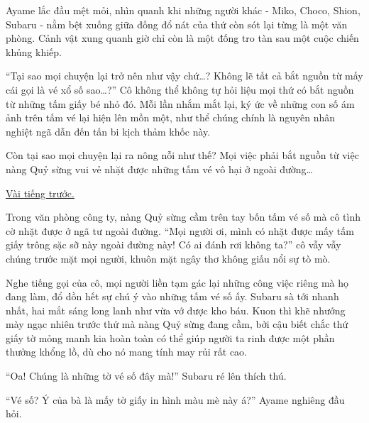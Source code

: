 \documentclass[../main.tex]{subfiles}
\begin{document}

Ayame lắc đầu mệt mỏi, nhìn quanh khi những người khác - Miko, Choco, Shion, Subaru - nằm bệt xuống giữa đống đổ nát của thứ còn sót lại từng là một văn phòng. Cảnh vật xung quanh giờ chỉ còn là một đống tro tàn sau một cuộc chiến khủng khiếp.


``Tại sao mọi chuyện lại trở nên như vậy chứ\dots? Không lẽ tất cả bắt nguồn từ mấy cái gọi là vé xổ số sao\dots?'' Cô không thể không tự hỏi liệu mọi thứ có bắt nguồn từ những tấm giấy bé nhỏ đó. Mỗi lần nhắm mắt lại, ký ức về những con số ám ảnh trên tấm vé lại hiện lên mồn một, như thể chúng chính là nguyên nhân nghiệt ngã dẫn đến tấn bi kịch thảm khốc này.

Còn tại sao mọi chuyện lại ra nông nỗi như thế? Mọi việc phải bắt nguồn từ việc nàng Quỷ sừng vui vẻ nhặt được những tấm vé vô hại ở ngoài đường\dots

\begin{center}
  \uline{Vài tiếng trước.}
\end{center}

Trong văn phòng công ty, nàng Quỷ sừng cầm trên tay bốn tấm vé số mà cô tình cờ nhặt được ở ngã tư ngoài đường. ``Mọi người ơi, mình có nhặt được mấy tấm giấy trông sặc sỡ này ngoài đường này! Có ai đánh rơi không ta?'' cô vẫy vẫy chúng trước mặt mọi người, khuôn mặt ngây thơ không giấu nổi sự tò mò.

Nghe tiếng gọi của cô, mọi người liền tạm gác lại những công việc riêng mà họ đang làm, đổ dồn hết sự chú ý vào những tấm vé số ấy. Subaru sà tới nhanh nhất, hai mắt sáng long lanh như vừa vớ được kho báu. Kuon thì khẽ nhướng mày ngạc nhiên trước thứ mà nàng Quỷ sừng đang cầm, bởi cậu biết chắc thứ giấy tờ mỏng manh kia hoàn toàn có thể giúp người ta rinh được một phần thưởng khổng lồ, dù cho nó mang tính may rủi rất cao.

``Oa! Chúng là những tờ vé số đây mà!'' Subaru ré lên thích thú.

``Vé số? Ý của bà là mấy tờ giấy in hình màu mè này á?'' Ayame nghiêng đầu hỏi.
\end{document}
